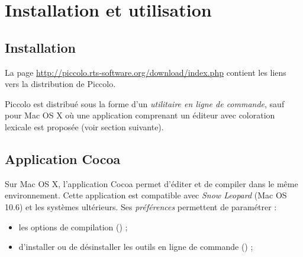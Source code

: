 
\cleardoublepage

\chapter{Installation et utilisation}

\thispagestyle{empty}


\section{Installation}

La page \url{http://piccolo.rts-software.org/download/index.php} contient les liens vers la distribution de Piccolo. 

Piccolo est distribué sous la forme d'un \emph{utilitaire en ligne de commande}, sauf pour Mac OS X où une application comprenant un éditeur avec coloration lexicale est proposée (voir section suivante).





\section{Application Cocoa}

Sur Mac OS X, l'application Cocoa permet d'éditer et de compiler dans le même environnement. Cette application est compatible avec \emph{Snow Leopard} (Mac OS 10.6) et les systèmes ultérieurs. Ses \emph{préférences} permettent de paramétrer :
\begin{itemize}
\item les options de compilation () ;
\item d'installer ou de désinstaller les outils en ligne de commande () ;
\end{itemize}


